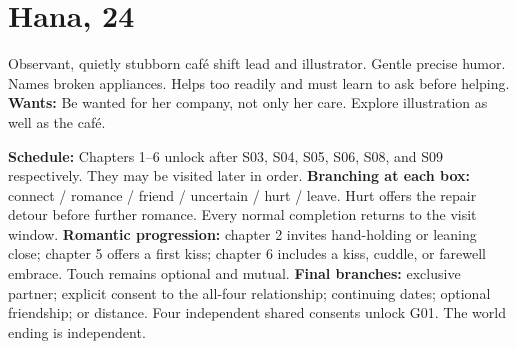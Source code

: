 \documentclass[11pt]{article}
\begin{document}
\section*{Hana, 24}
Observant, quietly stubborn café shift lead and illustrator. Gentle precise humor. Names broken appliances. Helps too readily and must learn to ask before helping.
\medskip
\textbf{Wants:} Be wanted for her company, not only her care. Explore illustration as well as the café.
\medskip
\begin{center}\end{center}
\textbf{Schedule:} Chapters 1--6 unlock after S03, S04, S05, S06, S08, and S09 respectively. They may be visited later in order.
\medskip
\textbf{Branching at each box:} connect / romance / friend / uncertain / hurt / leave. Hurt offers the repair detour before further romance. Every normal completion returns to the visit window.
\medskip
\textbf{Romantic progression:} chapter 2 invites hand-holding or leaning close; chapter 5 offers a first kiss; chapter 6 includes a kiss, cuddle, or farewell embrace. Touch remains optional and mutual.
\medskip
\textbf{Final branches:} exclusive partner; explicit consent to the all-four relationship; continuing dates; optional friendship; or distance. Four independent shared consents unlock G01. The world ending is independent.
\newpage
\end{document}
